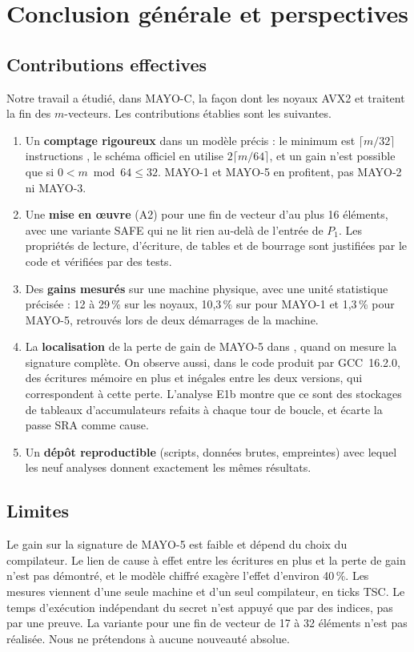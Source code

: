 \chapter*{Conclusion générale et perspectives}

\section*{Contributions effectives}
Notre travail a étudié, dans MAYO-C, la façon dont les noyaux AVX2  et  traitent la fin des $m$-vecteurs. Les contributions établies sont les suivantes.
\begin{enumerate}
\item Un \textbf{comptage rigoureux} dans un modèle précis : le minimum est $\lceil m/32\rceil$ instructions \vpshufb{}, le schéma officiel en utilise $2\lceil m/64\rceil$, et un gain n'est possible que si $0<m\bmod64\le32$. MAYO-1 et MAYO-5 en profitent, pas MAYO-2 ni MAYO-3.
\item Une \textbf{mise en œuvre} (A2) pour une fin de vecteur d'au plus 16 éléments, avec une variante SAFE qui ne lit rien au-delà de l'entrée de $P_1$. Les propriétés de lecture, d'écriture, de tables et de bourrage sont justifiées par le code et vérifiées par des tests.
\item Des \textbf{gains mesurés} sur une machine physique, avec une unité statistique précisée : 12 à 29\,\% sur les noyaux, 10,3\,\% sur  pour MAYO-1 et 1,3\,\% pour MAYO-5, retrouvés lors de deux démarrages de la machine.
\item La \textbf{localisation} de la perte de gain de MAYO-5 dans , quand on mesure la signature complète. On observe aussi, dans le code produit par GCC~16.2.0, des écritures mémoire en plus et inégales entre les deux versions, qui correspondent à cette perte. L'analyse E1b montre que ce sont des stockages de tableaux d'accumulateurs refaits à chaque tour de boucle, et écarte la passe SRA comme cause.
\item Un \textbf{dépôt reproductible} (scripts, données brutes, empreintes) avec lequel les neuf analyses donnent exactement les mêmes résultats.
\end{enumerate}

\section*{Limites}
Le gain sur la signature de MAYO-5 est faible et dépend du choix du compilateur. Le lien de cause à effet entre les écritures en plus et la perte de gain n'est pas démontré, et le modèle chiffré exagère l'effet d'environ 40\,\%. Les mesures viennent d'une seule machine et d'un seul compilateur, en ticks TSC. Le temps d'exécution indépendant du secret n'est appuyé que par des indices, pas par une preuve. La variante pour une fin de vecteur de 17 à 32 éléments n'est pas réalisée. Nous ne prétendons à aucune nouveauté absolue.


